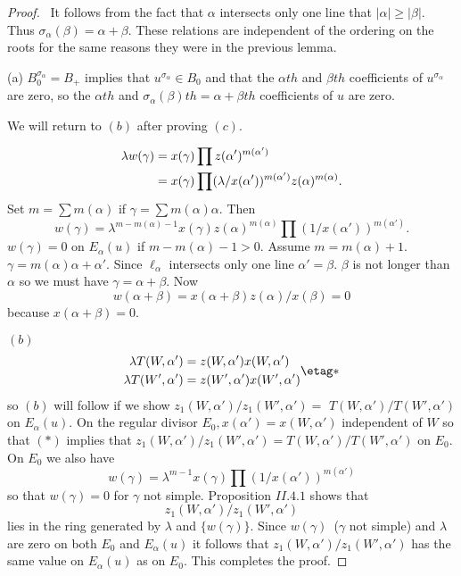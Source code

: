 \documentclass{memo-l}
\theoremstyle{definition}
\theoremstyle{remark}
\numberwithin{section}{chapter}
\numberwithin{equation}{chapter}
\begin{document}
\begin{proof} \ It follows from the fact that ${\alpha}$ intersects
only one line that $\vert {\alpha}\vert \ge \vert {\beta}\vert .$ Thus
${\sigma}_{{\alpha}}({\beta})  =  {\alpha}+{\beta}$.  These relations are
independent of the ordering on the roots for the same reasons they were in
the previous lemma.

   (a) $B_{0}^{{\sigma}_{{\alpha}}} =  B_{+}$ implies that 
$u^{{\sigma}_{{\alpha}}}  \in  B_{0}$ and that the ${\alpha}th$ and
${\beta}th$ coefficients of $u^{{\sigma}_{{\alpha}}}$ are zero, so
the ${\alpha}th$ and ${\sigma}_{{\alpha}}({\beta})th  =  {\alpha}+{\beta}th$
coefficients of $u$ are zero.

   We will return to $(b)$ after proving $(c)$.
 
$$
\aligned
{\lambda}w({\gamma})  &=  x({\gamma}) \prod z({\alpha}')^{m({\alpha}')} \\
            & =  x({\gamma}) \prod ({\lambda}/x({\alpha}'))^{m({\alpha}')} 
z({\alpha})^{m({\alpha})}.
\endaligned
$$
Set $m  =  \sum m({\alpha})$ if ${\gamma}  =  \sum m({\alpha}){\alpha}$.
Then 
$$
w({\gamma})  =  {\lambda}^{m-m({\alpha})-1}
x({\gamma})z({\alpha})^{m({\alpha})} \prod (1/x({\alpha}'))^{m({\alpha}')}.
$$
$w({\gamma})  =  0$ on $E_{{\alpha}}(u)$ if $m-m({\alpha})-1 > 0$.  Assume
$m = m({\alpha})+1$.  ${\gamma}  =  m({\alpha}){\alpha}+{\alpha}'$.  Since
${\ell}_{{\alpha}}$ intersects only one line ${\alpha}' = {\beta}$.
${\beta}$ is not longer than ${\alpha}$ so we must have ${\gamma}  = 
{\alpha}+{\beta}$.  Now
$$
w({\alpha+\beta})  =  x(\alpha+\beta)z(\alpha)/x(\beta)=0$$
because $x({\alpha}+{\beta}) = 0$.

\medskip
   $(b)$
$$
\aligned
\lambda T(W,{\alpha}')  &=  z(W,{\alpha}')x(W,{\alpha}')\\
\lambda T(W',{\alpha}')  &=  z(W',{\alpha}')x(W',{\alpha}')  
\endaligned    \etag *
$$
so $(b)$ will follow if we show $z_{1}(W,{\alpha}')/z_{1}(W',{\alpha}')  =$ 
$T(W,{\alpha}')/T(W',{\alpha}')$ on $E_{{\alpha}}(u)$.  On the regular
divisor $E_{0}, x({\alpha}')  =  x(W,{\alpha}')$ independent of $W$ so that
$(*)$ implies that 
\newline 
$z_{1}(W,{\alpha}')/z_{1}(W',{\alpha}')  = 
T(W,{\alpha}')/T(W',{\alpha}')$ on $E_{0}$.  On $E_{0}$ we also have
$$
w({\gamma})  =  {\lambda}^{m-1}x({\gamma}) \prod (1/x({\alpha}'))^{m({\alpha}')}
$$
so that $w({\gamma})  =  0$ for ${\gamma}$ not simple.  Proposition $II.4.1$
shows that $$z_{1}(W,{\alpha}')/z_{1}(W',{\alpha}')$$ lies in the ring
generated by ${\lambda}$ and $\{w({\gamma})\}$.  Since $w({\gamma})$\ 
(${\gamma}$ not simple) and ${\lambda}$ are zero on both $E_{0}$ and
$E_{{\alpha}}(u)$ it follows that $z_{1}(W,{\alpha}')/z_{1}(W',{\alpha}')$
has the same value on $E_{{\alpha}}(u)$ as on $E_{0}$.  This completes the
proof.
\end{proof} 
\end{document}

